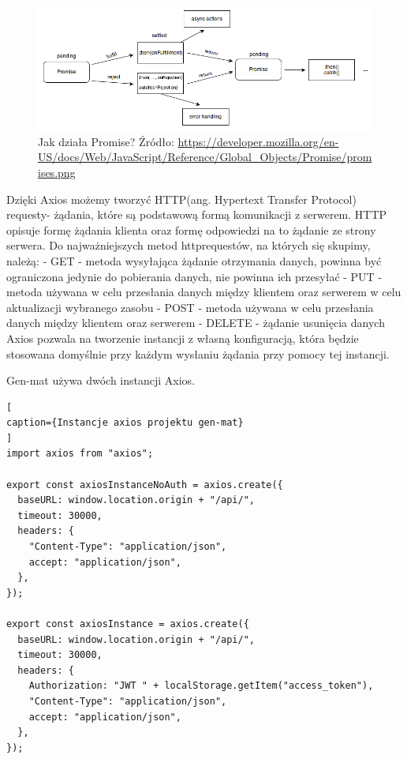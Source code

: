 \documentclass[oneside,polski,logo,indent]{amuthesis}
\begin{document}
\begin{enumerate}
\begin{enumerate}
\begin{figure}[H]
\centering
\includegraphics[width=13cm]{promises.png}
\caption{Jak działa Promise?
\newline
Źródło: \url{https://developer.mozilla.org/en-US/docs/Web/JavaScript/Reference/Global_Objects/Promise/promises.png}
}
\label{react dev example.jpg}
\end{figure}

Dzięki Axios możemy tworzyć HTTP(ang. Hypertext Transfer Protocol) requesty- żądania, które są podstawową formą komunikacji z serwerem. HTTP opisuje formę żądania klienta oraz formę odpowiedzi na to żądanie ze strony serwera. Do najważniejszych metod httprequestów, na których się skupimy, należą:
\newline
- GET - metoda wysyłająca żądanie otrzymania danych, powinna być ograniczona jedynie do pobierania danych, nie powinna ich przesyłać
\newline
- PUT - metoda używana w celu przesłania danych między klientem oraz serwerem w celu aktualizacji wybranego zasobu
\newline
- POST - metoda używana w celu przesłania danych między klientem oraz serwerem
\newline
- DELETE - żądanie usunięcia danych
\newline
Axios pozwala na tworzenie instancji z własną konfiguracją, która będzie stosowana domyślnie przy każdym wysłaniu żądania przy pomocy
tej instancji.


Gen-mat używa dwóch instancji Axios.

\begin{lstlisting}[
caption={Instancje axios projektu gen-mat}
]
import axios from "axios";

export const axiosInstanceNoAuth = axios.create({
  baseURL: window.location.origin + "/api/",
  timeout: 30000,
  headers: {
    "Content-Type": "application/json",
    accept: "application/json",
  },
});

export const axiosInstance = axios.create({
  baseURL: window.location.origin + "/api/",
  timeout: 30000,
  headers: {
    Authorization: "JWT " + localStorage.getItem("access_token"),
    "Content-Type": "application/json",
    accept: "application/json",
  },
});



\end{lstlisting}
\end{enumerate}
\end{enumerate}
\end{document}
